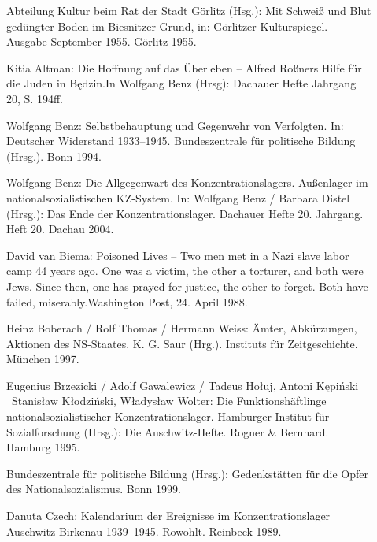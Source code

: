 \documentclass[a4paper,12pt,ngerman,
]{nisebook}
\begin{document}
\begin{description}
\item[]{Abteilung Kultur beim Rat der Stadt Görlitz (Hsg.): \glqq Mit Schweiß und Blut gedüngter Boden im Biesnitzer Grund\grqq, in: \glqq Görlitzer Kulturspiegel\grqq. Ausgabe September 1955. Görlitz 1955.}


\item[]{Kitia Altman: \glqq Die Hoffnung auf das Überleben -- Alfred Roßners Hilfe für die Juden in Będzin.\grqq In Wolfgang Benz (Hrsg): Dachauer Hefte Jahrgang 20, S. 194ff.}

\item[]{Wolfgang Benz: \glqq Selbstbehauptung und Gegenwehr von Verfolgten\grqq. In: \glqq Deutscher Widerstand 1933--1945\grqq. Bundeszentrale für politische Bildung (Hrsg.). Bonn 1994.}

\item[]{Wolfgang Benz: \glqq Die Allgegenwart des Konzentrationslagers. Außenlager im nationalsozialistischen KZ-System\grqq. In: Wolfgang Benz / Barbara Distel (Hrsg.): \glqq Das Ende der Konzentrationslager\grqq. Dachauer Hefte 20. Jahrgang. Heft 20. Dachau 2004. }

\item[]{David van Biema: \glqq Poisoned Lives -- Two men met in a Nazi slave labor camp 44 years ago. One was a victim, the other a torturer, and both were Jews. Since then, one has prayed for justice, the other to forget. Both have failed, miserably.\grqq Washington Post, 24. April 1988.}

\item[]{Heinz Boberach / Rolf Thomas / Hermann Weiss: \glqq Ämter, Abkürzungen, Aktionen des NS-Staates\grqq. K. G. Saur (Hrg.). Instituts für Zeitgeschichte. München 1997.}

\item[]{Eugenius Brzezicki / Adolf Gawalewicz / Tadeus Ho\l uj, Antoni Kępiński \ Stanis\l aw K\l odziński, W\l adys\l aw Wolter: \glqq Die Funktionshäftlinge nationalsozialistischer Konzentrationslager\grqq. 
Hamburger Institut für Sozialforschung (Hrsg.): \glqq Die Auschwitz-Hefte\grqq. Rogner \& Bernhard. Hamburg 1995.}

\item[]{Bundeszentrale für politische Bildung (Hrsg.): \glqq Gedenkstätten für die Opfer des Nationalsozialismus\grqq. Bonn 1999. }

\item[]{Danuta Czech: \glqq Kalendarium der Ereignisse im Konzentrationslager Auschwitz-Birkenau 1939--1945\grqq. Rowohlt. Reinbeck 1989.}


\end{description}
\end{document}
